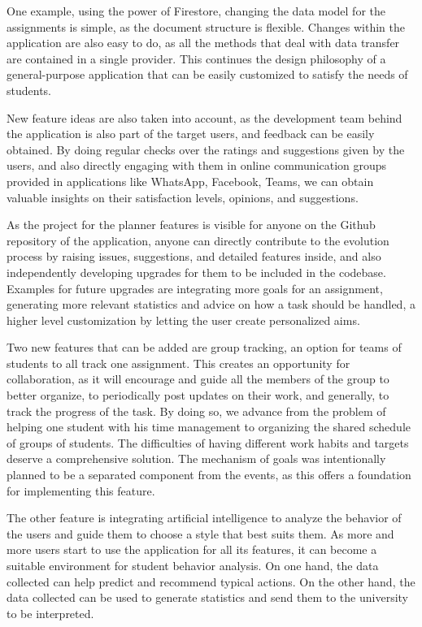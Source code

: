 One example, using the power of Firestore, changing the data model for the assignments is simple, as the document structure is flexible. Changes within the application are also easy to do, as all the methods that deal with data transfer are contained in a single provider. This continues the design philosophy of a general-purpose application that can be easily customized to satisfy the needs of students. 

New feature ideas are also taken into account, as the development team behind the application is also part of the target users, and feedback can be easily obtained. By doing regular checks over the ratings and suggestions given by the users, and also directly engaging with them in online communication groups provided in applications like WhatsApp, Facebook, Teams, we can obtain valuable insights on their satisfaction levels, opinions, and suggestions.

As the project for the planner features is visible for anyone on the Github repository of the application, anyone can directly contribute to the evolution process by raising issues, suggestions, and detailed features inside, and also independently developing upgrades for them to be included in the codebase. Examples for future upgrades are integrating more goals for an assignment, generating more relevant statistics and advice on how a task should be handled, a higher level customization by letting the user create personalized aims.

Two new features that can be added are group tracking, an option for teams of students to all track one assignment. This creates an opportunity for collaboration, as it will encourage and guide all the members of the group to better organize, to periodically post updates on their work, and generally, to track the progress of the task. By doing so, we advance from the problem of helping one student with his time management to organizing the shared schedule of groups of students. The difficulties of having different work habits and targets deserve a comprehensive solution. The mechanism of goals was intentionally planned to be a separated component from the events, as this offers a foundation for implementing this feature.

The other feature is integrating artificial intelligence to analyze the behavior of the users and guide them to choose a style that best suits them. As more and more users start to use the application for all its features, it can become a suitable environment for student behavior analysis. On one hand, the data collected can help predict and recommend typical actions. On the other hand, the data collected can be used to generate statistics and send them to the university to be interpreted. 	

